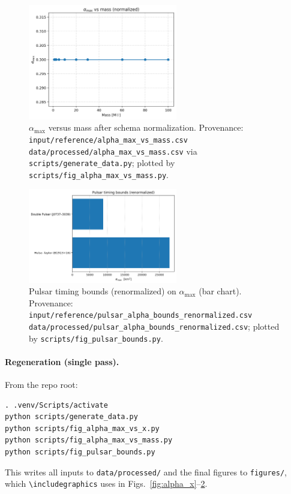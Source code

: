 \documentclass{iopjournal}
\begin{document}
\begin{figure}[H]
  \centering
  \includegraphics[width=0.58\textwidth]{alpha_max_vs_mass.png}
  \caption{$\alpha_{\max}$ versus mass after schema normalization. Provenance: \texttt{input/reference/alpha\_max\_vs\_mass.csv} \Rightarrow \texttt{data/processed/alpha\_max\_vs\_mass.csv} via \texttt{scripts/generate\_data.py}; plotted by \texttt{scripts/fig\_alpha\_max\_vs\_mass.py}.}
  \label{fig:alpha_mass}
\end{figure}

\begin{figure}[H]
  \centering
  \includegraphics[width=0.58\textwidth]{pulsar_alpha_bounds.png}
  \caption{Pulsar timing bounds (renormalized) on $\alpha_{\max}$ (bar chart). Provenance: \texttt{input/reference/pulsar\_alpha\_bounds\_renormalized.csv} \Rightarrow \texttt{data/processed/pulsar\_alpha\_bounds\_renormalized.csv}; plotted by \texttt{scripts/fig\_pulsar\_bounds.py}.}
  \label{fig:pulsar_bounds}
\end{figure}

\paragraph{Regeneration (single pass).}
From the repo root:
\begin{verbatim}
. .venv/Scripts/activate
python scripts/generate_data.py
python scripts/fig_alpha_max_vs_x.py
python scripts/fig_alpha_max_vs_mass.py
python scripts/fig_pulsar_bounds.py
\end{verbatim}
This writes all inputs to \texttt{data/processed/} and the final figures to \texttt{figures/}, which \texttt{\textbackslash includegraphics} uses in Figs.~\ref{fig:alpha_x}–\ref{fig:pulsar_bounds}.
\end{document}
